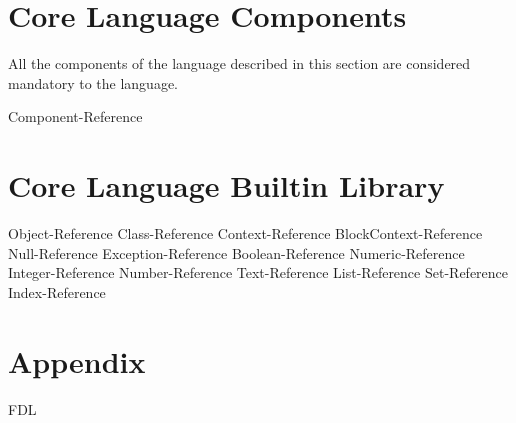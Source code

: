 \documentclass [10pt]{article}
\begin{document}
\newpage
\section {Core Language Components}

All the components of the language described in this section are considered
mandatory to the language.

 {Component-Reference}

\newpage
\section {Core Language Builtin Library}
 {Object-Reference}
 {Class-Reference}
 {Context-Reference}
 {BlockContext-Reference}
 {Null-Reference}
 {Exception-Reference}
 {Boolean-Reference}
 {Numeric-Reference}
 {Integer-Reference}
 {Number-Reference}
 {Text-Reference}
 {List-Reference}
 {Set-Reference}
 {Index-Reference}

\newpage
\section {Appendix}
 {FDL}
\end{document}
